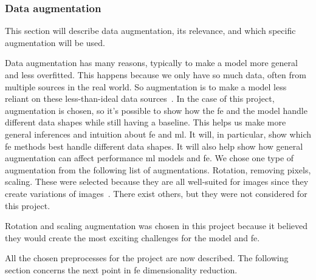 \subsubsection{Data augmentation}\label{subsec:data-augmentation}
This section will describe data augmentation, its relevance, and which specific augmentation will be used.


Data augmentation has many reasons, typically to make a model more general and less overfitted. This happens because we only have so much data, often from multiple sources in the real world. So augmentation is to make a model less reliant on these less-than-ideal data sources~\cite {MAHARANA202291}.
In the case of this project, augmentation is chosen, so it's possible to show how the \gls{fe} and the model handle different data shapes while still having a baseline. This helps us make more general inferences and intuition about \gls{fe} and \gls{ml}. It will, in particular, show which \gls{fe} methods best handle different data shapes. It will also help show how general augmentation can affect performance \gls{ml} models and \gls{fe}.
We chose one type of augmentation from the following list of augmentations. Rotation, removing pixels, scaling. These were selected because they are all well-suited for images since they create variations of images~\cite{gonzalez2008digital}. There exist others, but they were not considered for this project. 

Rotation and scaling augmentation was chosen in this project because it believed they would create the most exciting challenges for the model and \gls{fe}. 

All the chosen preprocesses for the project are now described. The following section concerns the next point in \gls{fe} dimensionality reduction. 






